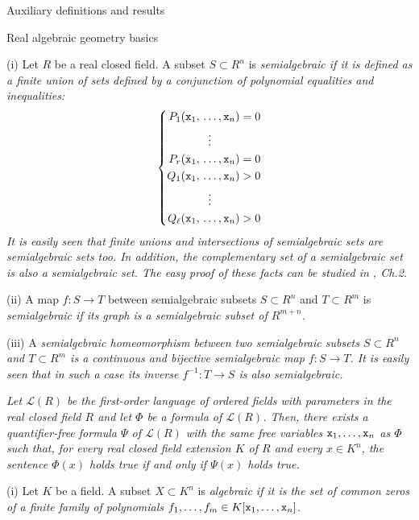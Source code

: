 \documentclass[11pt, a4paper, english, twoside, notitlepage, openright]{report}
\begin{document}
\begin{chapter}{Auxiliary definitions and results}
\begin{section}{Real algebraic geometry basics}
\begin{definitions}\label{semialgSet} (i) Let $R$ be a real closed field. A subset $S\subset R^n$ is \em semialgebraic \em if it is defined as a finite union of sets defined by a conjunction of polynomial equalities and inequalities: 
	\begin{equation*}
	\left\{
	\begin{aligned}
		P_1({\tt x}_1,\, .\,&.\,.\,,{\tt x}_n)=0\\
		&\vdots\\
		P_r({\tt x}_1,\, .\,&.\,.\,,{\tt x}_n)=0\\
		Q_1({\tt x}_1,\, .\,&.\,.\,,{\tt x}_n)>0 \\
		&\vdots\\
		Q_{\ell}({\tt x}_1,\, .\,&.\,.\,,{\tt x}_n)>0\\
	\end{aligned}
	\right.
	\end{equation*}
It is easily seen that finite unions and intersections of semialgebraic sets are semialgebraic sets too. In addition, the complementary set of a semialgebraic set is also a semialgebraic set. The easy proof of these facts can be studied in \cite{bcr}, Ch.2.
	
	
(ii) A map $f:S\to T$ between semialgebraic subsets $S\subset R^n$ and $T\subset R^m$ is \em semialgebraic \em if its graph is a semialgebraic subset of $R^{m+n}$.  \end{definitions}


(iii) A \em semialgebraic homeomorphism \em between two semialgebraic subsets $S\subset R^n$ and $T\subset R^m$ is a continuous and bijective semialgebraic map $f:S\to T$. It is easily seen that in such a case its inverse $f^{-1}:T\to S$ is also semialgebraic.

\begin{theorem}\label{TP} \em Let ${\mathcal L}(R)$ be the first-order language of ordered fields with parameters in the real closed field $R$ and let $\Phi$ be a formula of ${\mathcal L}(R)$. Then, there exists a quantifier-free formula $\Psi$ of ${\mathcal L}(R)$ with the same free variables ${\tt x}_1,\dots,{\tt x}_n$ as $\Phi$ such that, for every real closed field extension $K$ of $R$ and every $x\in K^n$, the sentence $\Phi(x)$ holds true if and only if $\Psi(x)$ holds true.\em

\end{theorem}

\begin{definition}\label{zariski} (i) Let $K$ be a field. A subset $X\subset K^n$ is \em algebraic \em if it is the set of common zeros of a finite family of polynomials $f_1,\dots,f_m\in K[{\tt x}_1,\dots,{\tt x}_n]$. 


\end{definition}
\end{section}
\end{chapter}
\end{document}
